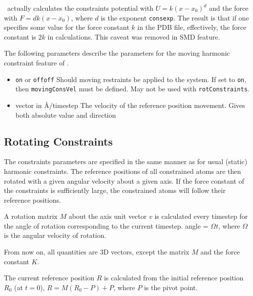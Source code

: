  \NAMD\ actually calculates the constraints
potential with $U = k (x-x_0)^d$ and the force with $F = d k (x-x_0)$,
where $d$ is the exponent {\tt consexp}. The result is that if one
specifies some value for the force constant $k$ in the PDB file,
effectively, the force constant is $2 k$ in calculations. This caveat
was removed in SMD feature.

The following parameters describe the parameters for the
moving harmonic constraint feature of \NAMD.

\begin{itemize}

\item
{}
{{\tt on} or {\tt off}}{{\tt off}}
{Should moving restraints be applied to the system. If set
to {\tt on}, then  {\tt movingConsVel} must be defined.
May not be used with {\tt rotConstraints}.}

\item
{}
{vector in \AA/timestep}
{The velocity of the reference position movement. Gives both absolute
value and direction}

\end{itemize}

\subsection{Rotating Constraints}

The constraints parameters are specified in the same manner as for
usual (static) harmonic constraints. The reference positions of all
constrained atoms are then rotated with a given angular velocity
about a given axis. If the force constant of the constraints is
sufficiently
large, the constrained atoms will follow their reference positions.

A rotation matrix $M$ about the axis unit vector $v$ is calculated every
timestep
for the angle of rotation corresponding to the current timestep.
    angle = $\Omega t$,
where $\Omega$ is the angular velocity of rotation.

From now on, all quantities are 3D vectors, except the matrix $M$ and the
force constant $K$.

The current reference position $R$ is calculated from the initial
reference
position $R_0$ (at $t=0$),
    $R = M (R_0 - P) + P$,
where $P$ is the pivot point.

%
%
%

